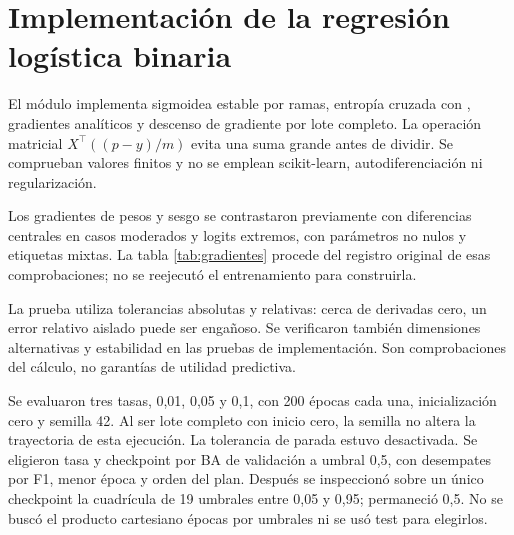 \barrerapagina
\section{Implementación de la regresión logística binaria}
El módulo  implementa sigmoidea estable por ramas, entropía cruzada con , gradientes analíticos y descenso de gradiente por lote completo. La operación matricial $X^\top((p-y)/m)$ evita una suma grande antes de dividir. Se comprueban valores finitos y no se emplean scikit-learn, autodiferenciación ni regularización.

Los gradientes de pesos y sesgo se contrastaron previamente con diferencias centrales en casos moderados y logits extremos, con parámetros no nulos y etiquetas mixtas. La tabla \ref{tab:gradientes} procede del registro original de esas comprobaciones; no se reejecutó el entrenamiento para construirla.

La prueba utiliza tolerancias absolutas y relativas: cerca de derivadas cero, un error relativo aislado puede ser engañoso. Se verificaron también dimensiones alternativas y estabilidad en las pruebas de implementación. Son comprobaciones del cálculo, no garantías de utilidad predictiva.


Se evaluaron tres tasas, 0,01, 0,05 y 0,1, con 200 épocas cada una, inicialización cero y semilla 42. Al ser lote completo con inicio cero, la semilla no altera la trayectoria de esta ejecución. La tolerancia de parada estuvo desactivada. Se eligieron tasa y checkpoint por BA de validación a umbral 0,5, con desempates por F1, menor época y orden del plan. Después se inspeccionó sobre un único checkpoint la cuadrícula de 19 umbrales entre 0,05 y 0,95; permaneció 0,5. No se buscó el producto cartesiano épocas por umbrales ni se usó test para elegirlos.

